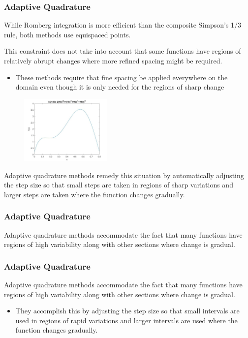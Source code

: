 \documentclass{if-beamer}
\begin{document}
\begin{frame}[t]
	\frametitle{Adaptive Quadrature}
	While Romberg integration is more efficient than the composite Simpson's 1/3 rule, both methods use equispaced points.  \\\vspace{7pt}
	
	This constraint does not take into account that some functions have regions of relatively abrupt changes where more refined spacing might be
	required.
	\begin{itemize}
		\item These methods require that fine spacing be applied everywhere on the domain even though it is only needed for the regions of sharp change
	\end{itemize}
	
	\begin{figure}
		\centering
		\includegraphics[width = 0.4\textwidth]{figures/example}
	\end{figure}
	Adaptive quadrature methods remedy this situation by automatically adjusting the step size so that small steps are taken in regions of sharp variations and larger steps are taken where the function changes gradually.
\end{frame}

\begin{frame}[t]
	\frametitle{Adaptive Quadrature}
	Adaptive quadrature methods accommodate the fact that many functions have regions of
	high variability along with other sections where change is gradual.
\end{frame}

\begin{frame}[t]
	\frametitle{Adaptive Quadrature}
	Adaptive quadrature methods accommodate the fact that many functions have regions of
	high variability along with other sections where change is gradual.
	\begin{itemize}
		\item They accomplish this
		by adjusting the step size so that small intervals are used in regions of rapid variations and
		larger intervals are used where the function changes gradually. \vspace{5pt}
	\end{itemize}
\end{frame}
\end{document}
